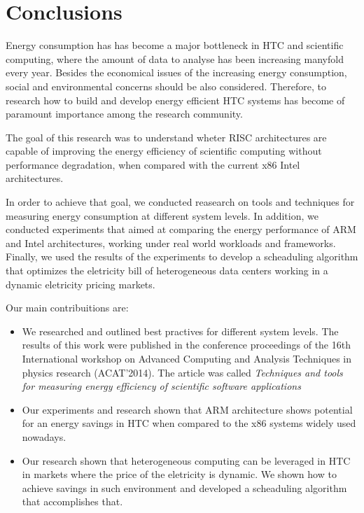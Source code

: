 \chapter{Conclusions}

Energy consumption has has become a major bottleneck in HTC and scientific computing, where the amount of data to analyse has been increasing manyfold every year. Besides the economical issues of the increasing energy consumption, social and environmental concerns should be also considered. Therefore, to research how to build and develop energy efficient HTC systems has become of paramount importance among the research community.

The goal of this research was to understand wheter RISC architectures are capable of improving the energy efficiency of scientific computing without performance degradation, when compared with the current x86 Intel architectures.

In order to achieve that goal, we conducted reasearch on tools and techniques for measuring energy consumption at different system levels. In addition, we conducted experiments that aimed at comparing the energy performance of ARM and Intel architectures, working under real world workloads and frameworks. Finally, we used the results of the experiments to develop a scheaduling algorithm that optimizes the eletricity bill of heterogeneous data centers working in a dynamic eletricity pricing markets. 

\vspace{5mm}

Our main contribuitions are: 

\begin{itemize}
  \item We researched and outlined best practives for different system levels. The results of this work were published in the conference proceedings of the 16th International workshop on Advanced Computing and Analysis Techniques in physics research (ACAT'2014). The article was called \textit{Techniques and tools for measuring energy efficiency of scientific software applications}

  \item Our experiments and research shown that ARM architecture shows potential for an energy savings in HTC when compared to the x86 systems widely used nowadays. 

  \item Our research shown that heterogeneous computing can be leveraged in HTC in markets where the price of the eletricity is dynamic. We shown how to achieve savings in such environment and developed a scheaduling algorithm that accomplishes that.
\end{itemize}
